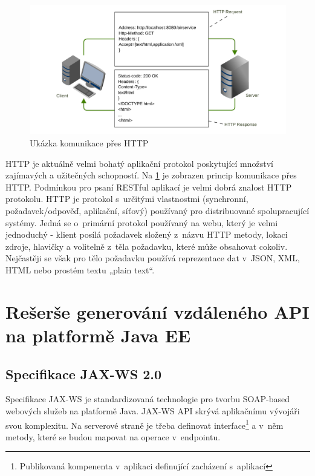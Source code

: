 \documentclass[11pt,twoside,a4paper]{book}
\begin{document}
\begin{figure}[h]
\begin{center}
\includegraphics[width=13cm]{images-pdf/http.pdf}
\caption{Ukázka komunikace přes HTTP}
\label{fig:http-komunikace}
\end{center}
\end{figure}

HTTP je aktuálně velmi bohatý aplikační protokol poskytující množství zajímavých a
užitečných schopností. Na \ref{fig:http-komunikace} je zobrazen princip
komunikace přes HTTP. Podmínkou pro psaní RESTful aplikací je velmi dobrá
znalost HTTP protokolu.
HTTP je protokol s~určitými vlastnostmi (synchronní, požadavek/odpověď, aplikační, síťový) používaný pro distribuované spolupracující systémy. Jedná se o~primární
protokol používaný na webu, který je velmi jednoduchý - klient posílá požadavek složený
z~názvu HTTP metody, lokaci zdroje, hlavičky a volitelně z~těla požadavku, které může
obsahovat cokoliv. Nejčastěji se však pro tělo požadavku používá reprezentace dat v~JSON,
XML, HTML nebo prostém textu „plain text“.

\section{Rešerše generování vzdáleného API na platformě Java EE}

\subsection{Specifikace JAX-WS 2.0} 
\label{subsec:specifikace-jax-ws}

Specifikace JAX-WS \cite{JAXWS20} je standardizovaná technologie pro tvorbu SOAP-based
webových služeb na platformě Java. JAX-WS API skrývá aplikačnímu vývojáři svou
komplexitu.
Na serverové straně je třeba definovat interface\footnote{Publikovaná kompenenta
v~aplikaci definující zacházení s~aplikací} a v~něm metody, které se budou
mapovat na operace v~endpointu.
\end{document}
